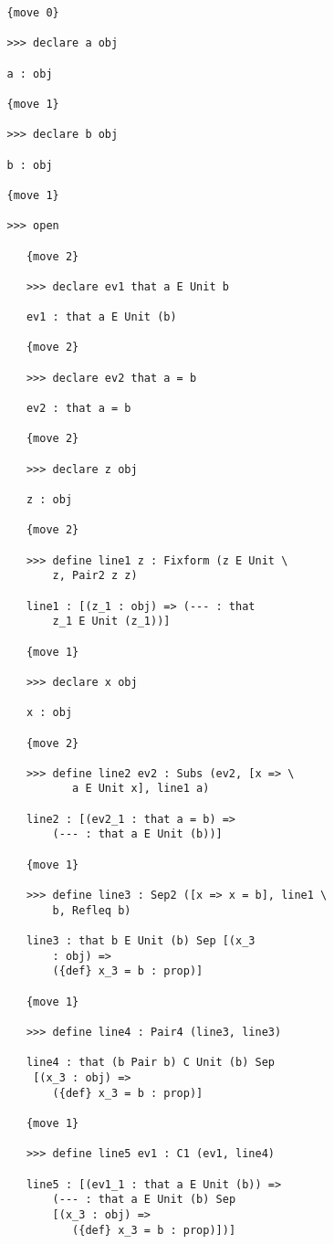 \documentclass[12pt]{article}
\begin{document}
\begin{enumerate}
\begin{verbatim}
   {move 0}

   >>> declare a obj

   a : obj

   {move 1}

   >>> declare b obj

   b : obj

   {move 1}

   >>> open

      {move 2}

      >>> declare ev1 that a E Unit b

      ev1 : that a E Unit (b)

      {move 2}

      >>> declare ev2 that a = b

      ev2 : that a = b

      {move 2}

      >>> declare z obj

      z : obj

      {move 2}

      >>> define line1 z : Fixform (z E Unit \
          z, Pair2 z z)

      line1 : [(z_1 : obj) => (--- : that 
          z_1 E Unit (z_1))]

      {move 1}

      >>> declare x obj

      x : obj

      {move 2}

      >>> define line2 ev2 : Subs (ev2, [x => \
             a E Unit x], line1 a)

      line2 : [(ev2_1 : that a = b) => 
          (--- : that a E Unit (b))]

      {move 1}

      >>> define line3 : Sep2 ([x => x = b], line1 \
          b, Refleq b)

      line3 : that b E Unit (b) Sep [(x_3 
          : obj) => 
          ({def} x_3 = b : prop)]

      {move 1}

      >>> define line4 : Pair4 (line3, line3)

      line4 : that (b Pair b) C Unit (b) Sep 
       [(x_3 : obj) => 
          ({def} x_3 = b : prop)]

      {move 1}

      >>> define line5 ev1 : C1 (ev1, line4)

      line5 : [(ev1_1 : that a E Unit (b)) => 
          (--- : that a E Unit (b) Sep 
          [(x_3 : obj) => 
             ({def} x_3 = b : prop)])]


\end{verbatim}
\end{enumerate}
\end{document}
